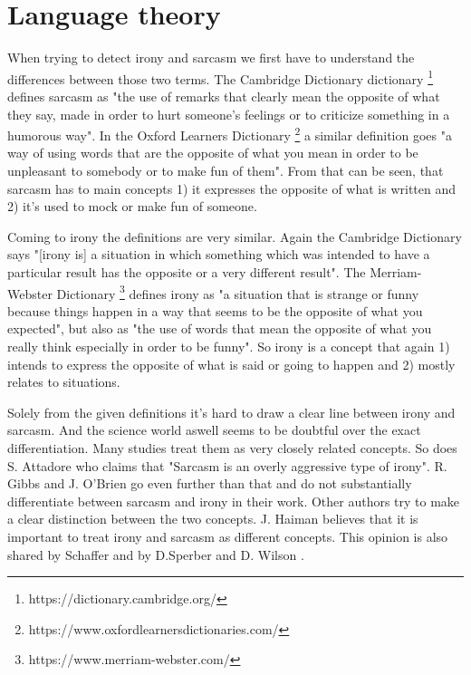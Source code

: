 \documentclass[sigconf,  review=false, nonacm=true]{acmart}
\begin{document}
\section{Language theory}
\label{lang-theo}

When trying to detect irony and sarcasm we first have to understand the differences between those two terms. The Cambridge Dictionary dictionary \footnote{https://dictionary.cambridge.org/} defines sarcasm as "the use of remarks that clearly mean the opposite of what they say, made in order to hurt someone's feelings or to criticize something in a humorous way". In the Oxford Learners Dictionary \footnote{https://www.oxfordlearnersdictionaries.com/} a similar definition goes "a way of using words that are the opposite of what you mean in order to be unpleasant to somebody or to make fun of them". From that can be seen, that sarcasm has to main concepts 1) it expresses the opposite of what is written and 2) it's used to mock or make fun of someone.

Coming to irony the definitions are very similar. Again the Cambridge Dictionary says "[irony is] a situation in which something which was intended to have a particular result has the opposite or a very different result". The Merriam-Webster Dictionary \footnote{https://www.merriam-webster.com/} defines irony as "a situation that is strange or funny because things happen in a way that seems to be the opposite of what you expected", but also as "the use of words that mean the opposite of what you really think especially in order to be funny". So irony is a concept that again 1) intends to express the opposite of what is said or going to happen and 2) mostly relates to situations.

Solely from the given definitions it's hard to draw a clear line between irony and sarcasm. And the science world aswell seems to be doubtful over the exact differentiation. Many studies treat them as very closely related concepts. So does S. Attadore \cite{Irony-as-relevant-inappropriateness} who claims that "Sarcasm is an overly aggressive type of irony". R. Gibbs and J. O'Brien \cite{Psychological_aspects_of_irony_understanding} go even further than that and do not substantially differentiate between sarcasm and irony in their work. Other authors try to make a clear distinction between the two concepts. J. Haiman \cite{Sarcasm-as-theater} believes that it is important to treat irony and sarcasm as different concepts. This opinion is also shared by Schaffer \cite{Vocal-Cues-for-Irony-in-English} and by D.Sperber and D. Wilson \cite{Irony-and-the-use-mention-distinction}.
\end{document}
